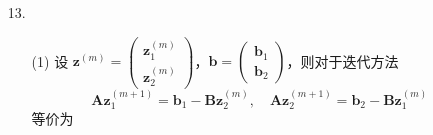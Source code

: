 \documentclass{sjtuarticle}
\begin{document}
\begin{itemize}
\begin{proof}
\begin{equation*}
        \end{equation*}
        讨论 $\bm{L}_\omega=\bm{E}-\omega\bm{A}$ 的特征值 $\lambda$，对于任意的 $\bm{y}\in\mathbf{R}^{n}$，有
        \begin{align}
            \bm{L}_\omega\bm{y}&=\lambda\bm{y} \nonumber \\
            (\bm{E}-\omega\bm{A})\bm{y}&=\lambda\bm{y} \nonumber \\
            \bm{y}-\omega\bm{A}\bm{y}&=\lambda\bm{y} \label{eq:one}
        \end{align}
        对于 $\bm{A}$ 的特征值 $0<\alpha\leq\lambda^\prime\leq\beta$，有
        \begin{equation}
            \bm{A}\bm{y}=\lambda^\prime\bm{y} \label{eq:two}
        \end{equation}
        结合式 \eqref{eq:one} 和 \eqref{eq:two} 有
        \begin{equation*}
            (1-\omega\lambda^\prime-\lambda)\bm{y}=\bm{0}
        \end{equation*}
        考虑到对于 $\forall \bm{y}\in \mathbf{R}^n$ 都成立，有
        \begin{equation*}
            \lambda = 1-\omega\lambda^\prime
        \end{equation*}
        当 $0<\omega<\frac{2}{\beta}$ 时，有
        \begin{equation*}
            -1=1-\frac{2}{\beta}\beta<\lambda<1-0=1
        \end{equation*}
        即 $|\lambda|< 1$，则迭代法收敛。
    \end{proof}
    \item[13.] \begin{solution}
        \begin{itemize}
            \item[(1)] 设 $\bm{z}^{(m)}=\begin{pmatrix}
                \bm{z}_1^{(m)} \\ \bm{z}_2^{(m)}
            \end{pmatrix}$，$\bm{b}=\begin{pmatrix}
                \bm{b}_1 \\ \bm{b}_2
            \end{pmatrix}$，则对于迭代方法
            \begin{equation*}
                \bm{A}\bm{z}_1^{(m+1)}=\bm{b}_1-\bm{B}\bm{z}_2^{(m)},\quad \bm{A}\bm{z}_2^{(m+1)}=\bm{b}_2-\bm{B}\bm{z}_1^{(m)}
            \end{equation*}
            等价为

\end{itemize}
\end{solution}
\end{itemize}
\end{document}
